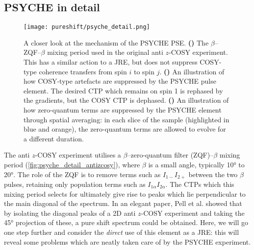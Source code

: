 \subsection{PSYCHE in detail}
\label{subsec:pureshift__psyche_analysis}

\begin{figure}[ht]
    \centering
    \texttt{[image: pureshift/psyche\_detail.png]}%
    {\label{fig:psyche_detail_antizcosy}}%
    {\label{fig:psyche_detail_cosy_suppress}}%
    {\label{fig:psyche_detail_zqc_suppress}}%
    \caption[Detailed analysis of anti $z$-COSY and PSYCHE]{
        A closer look at the mechanism of the PSYCHE PSE.
        \textbf{()} The $\beta$--ZQF--$\beta$ mixing period used in the original anti $z$-COSY experiment. This has a similar action to a JRE, but does not suppress COSY-type coherence transfers from spin $i$ to spin $j$.
        \textbf{()} An illustration of how COSY-type artefacts are suppressed by the PSYCHE pulse element. The desired CTP which remains on spin 1 is rephased by the gradients, but the COSY CTP is dephased.
        \textbf{()} An illustration of how zero-quantum terms are suppressed by the PSYCHE element through spatial averaging: in each slice of the sample (highlighted in blue and orange), the zero-quantum terms are allowed to evolve for a different duration.
    }
    \label{fig:psyche_detail}
\end{figure}

The anti $z$-COSY experiment utilises a $\beta$--zero-quantum filter (ZQF)--$\beta$ mixing period (\cref{fig:psyche_detail_antizcosy}), where $\beta$ is a small angle, typically \ang{10} to \ang{20}.
The role of the ZQF\autocite{Thrippleton2003ACIE} is to remove terms such as $I_{1-}I_{2+}$ between the two $\beta$ pulses, retaining only population terms such as $I_{1\alpha}I_{2\alpha}$.
The CTPs which this mixing period selects for ultimately give rise to peaks which lie perpendicular to the main diagonal of the spectrum.
In an elegant paper, Pell et al.\autocite{Pell2007MRC} showed that by isolating the diagonal peaks of a 2D anti $z$-COSY experiment and taking the \ang{45} projection of these, a pure shift spectrum could be obtained.
Here, we will go one step further and consider the \textit{direct} use of this element as a JRE: this will reveal some problems which are neatly taken care of by the PSYCHE experiment.

